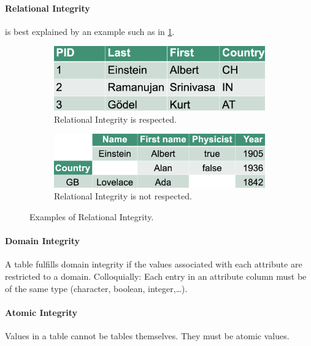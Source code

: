 \paragraph{Relational Integrity}
is best explained by an example such as in \cref{fig:RelInteg}.

\begin{figure}[h]
    \centering
    \begin{subfigure}{0.45\textwidth}
        \centering
        \includegraphics[width=\textwidth]{Figures/RelationalIntegrityTrue.png}
        \caption{Relational Integrity is respected.}
    \end{subfigure}
    \hfill
    \begin{subfigure}{0.5\textwidth}
        \centering
        \includegraphics[width=\textwidth]{Figures/RelationalIntegrityFalse.png}
        \caption{Relational Integrity is not respected.}
    \end{subfigure}
    \caption{Examples of Relational Integrity.}\label{fig:RelInteg}
\end{figure}

\paragraph{Domain Integrity}
A table fulfills domain integrity if the values associated with each attribute are restricted to a domain. Colloquially: Each entry in an attribute column must be of the same type (character, boolean, integer,\dots).

\paragraph{Atomic Integrity}
Values in a table cannot be tables themselves. They must be atomic values.

